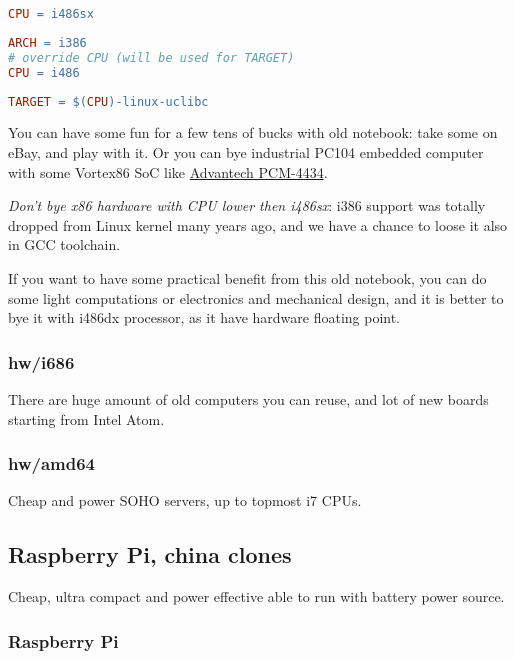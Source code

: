 \begin{lstlisting}[language=make,title=hw/i486sx]
CPU = i486sx
\end{lstlisting}
\begin{lstlisting}[language=make,title=cpu/i486sx]
ARCH = i386
# override CPU (will be used for TARGET)
CPU = i486
\end{lstlisting}
\begin{lstlisting}[language=make,title=arch/i386]
TARGET = $(CPU)-linux-uclibc
\end{lstlisting}

You can have some fun for a few tens of bucks with old notebook: take some on
eBay, and play with it. Or you can bye industrial PC104 embedded computer with
some Vortex86 SoC like
\href{http://www.advantech.ru/products/1-2jkltu/pcm-3343/mod_645a1e17-167a-4476-b253-ca4cf2e19428}{Advantech PCM-4434}.

\emph{Don't bye x86 hardware with CPU lower then i486sx}: i386 support was
totally dropped from Linux kernel many years ago, and we have a chance to loose
it also in GCC toolchain.

If you want to have some practical benefit from this old notebook, you can do
some light computations or electronics and mechanical design, and it is better
to bye it with i486dx processor, as it have hardware floating point. 

\subsubsection{hw/i686}

There are huge amount of old computers you can reuse, and lot of new boards
starting from Intel Atom.

\subsubsection{hw/amd64}

Cheap and power SOHO servers, up to topmost i7 CPUs.

\subsection{Raspberry Pi, china clones}

Cheap, ultra compact and power effective able to run with battery power source.

\subsubsection{Raspberry Pi}

